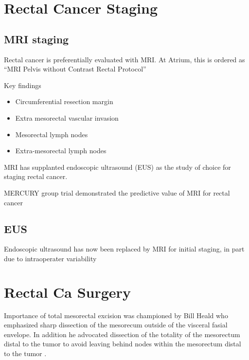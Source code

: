 \documentclass[
]{book}
\providecommand{\tightlist}{%
  \setlength{\itemsep}{0pt}\setlength{\parskip}{0pt}}
\begin{document}
\hypertarget{rectal-cancer-staging}{%
\chapter{Rectal Cancer Staging}\label{rectal-cancer-staging}}

\hypertarget{mri-staging}{%
\section{MRI staging}\label{mri-staging}}

Rectal cancer is preferentially evaluated with MRI. At Atrium, this is ordered as ``MRI Pelvis without Contrast Rectal Protocol''

Key findings

\begin{itemize}
\tightlist
\item
  Circumferential resection margin
\item
  Extra mesorectal vascular invasion
\item
  Mesorectal lymph nodes
\item
  Extra-mesorectal lymph nodes
\end{itemize}

MRI has supplanted endoscopic ultrasound (EUS) as the study of choice for staging rectal cancer.

MERCURY group trial demonstrated the predictive value of MRI for rectal cancer\citep{taylor34} \citep{mercurystudygroup779}

\hypertarget{eus}{%
\section{EUS}\label{eus}}

Endoscopic ultrasound has now been replaced by MRI for initial staging, in part due to intraoperater variability

\hypertarget{rectal-ca-surgery}{%
\chapter{Rectal Ca Surgery}\label{rectal-ca-surgery}}

Importance of total mesorectal excision was championed by Bill Heald \citep{heald1479} who emphasized sharp dissection of the mesorecum outside of the visceral fasial envelope. In addition he advocated dissection of the totality of the mesorectum distal to the tumor to avoid leaving behind nodes within the mesorectum distal to the tumor\citep{quirke996} \citep{nagtegaal303} \citep{paty365}.
\end{document}
